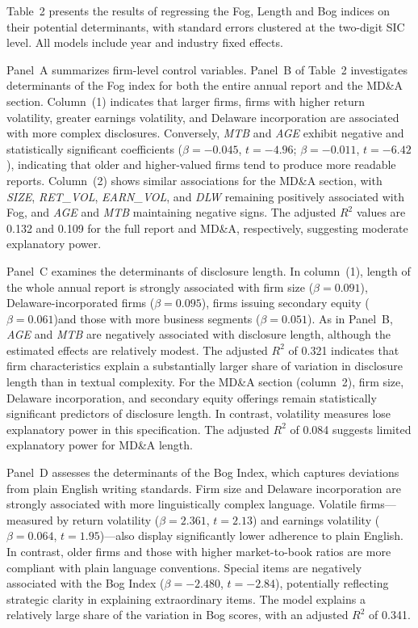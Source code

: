\documentclass[a4paper]{article}
\begin{document}
Table~2 presents the results of regressing the Fog, Length and Bog indices on their potential determinants, with standard errors clustered at the two-digit SIC level. All models include year and industry fixed effects.

Panel~A summarizes firm-level control variables. Panel~B of Table~2 investigates determinants of the Fog index for both the entire annual report and the MD\&A section. Column~(1) indicates that larger firms, firms with higher return volatility, greater earnings volatility, and Delaware incorporation are associated with more complex disclosures. Conversely, \textit{MTB} and \textit{AGE} exhibit negative and statistically significant coefficients ($\beta = -0.045$, $t = -4.96$; $\beta = -0.011$, $t = -6.42$), indicating that older and higher-valued firms tend to produce more readable reports. Column~(2) shows similar associations for the MD\&A section, with \textit{SIZE}, \textit{RET\_VOL}, \textit{EARN\_VOL}, and \textit{DLW} remaining positively associated with Fog, and \textit{AGE} and \textit{MTB} maintaining negative signs. The adjusted $R^2$ values are 0.132 and 0.109 for the full report and MD\&A, respectively, suggesting moderate explanatory power.

Panel~C examines the determinants of disclosure length. In column~(1), length of the whole annual report is strongly associated with firm size ($\beta = 0.091$), Delaware-incorporated firms ($\beta = 0.095$), firms issuing secondary equity ($\beta = 0.061$)and those with more business segments ($\beta = 0.051$). As in Panel~B, \textit{AGE} and \textit{MTB} are negatively associated with disclosure length, although the estimated effects are relatively modest. The adjusted $R^2$ of 0.321 indicates that firm characteristics explain a substantially larger share of variation in disclosure length than in textual complexity. For the MD\&A section (column~2), firm size, Delaware incorporation, and secondary equity offerings remain statistically significant predictors of disclosure length. In contrast, volatility measures lose explanatory power in this specification. The adjusted $R^2$ of 0.084 suggests limited explanatory power for MD\&A length.

Panel~D assesses the determinants of the Bog Index, which captures deviations from plain English writing standards. Firm size and Delaware incorporation are strongly associated with more linguistically complex language. Volatile firms—measured by return volatility ($\beta = 2.361$, $t = 2.13$) and earnings volatility ($\beta = 0.064$, $t = 1.95$)—also display significantly lower adherence to plain English. In contrast, older firms and those with higher market-to-book ratios are more compliant with plain language conventions. Special items are negatively associated with the Bog Index ($\beta = -2.480$, $t = -2.84$), potentially reflecting strategic clarity in explaining extraordinary items. The model explains a relatively large share of the variation in Bog scores, with an adjusted $R^2$ of 0.341.
\end{document}
